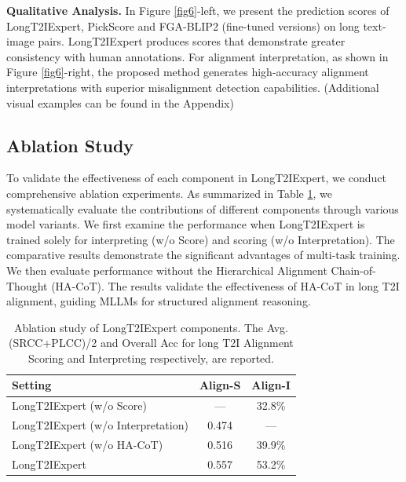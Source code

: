 \documentclass[letterpaper]{article} %
\begin{document}
\textbf{Qualitative Analysis.} In Figure \ref{fig6}-left, we present the prediction scores of LongT2IExpert, PickScore and FGA-BLIP2 (fine-tuned versions) on long text-image pairs. LongT2IExpert produces scores that demonstrate greater consistency with human annotations. For alignment interpretation, as shown in Figure \ref{fig6}-right, the proposed method generates high-accuracy alignment interpretations with superior misalignment detection capabilities. (Additional visual examples can be found in the Appendix)



\subsection{Ablation Study}
To validate the effectiveness of each component in LongT2IExpert, we conduct comprehensive ablation experiments. As summarized in Table \ref{tab:3}, we systematically evaluate the contributions of different components through various model variants. We first examine the performance when LongT2IExpert is trained solely for interpreting (w/o Score) and scoring (w/o Interpretation). The comparative results demonstrate the significant advantages of multi-task training. We then evaluate performance without the Hierarchical Alignment Chain-of-Thought (HA-CoT). The results validate the effectiveness of HA-CoT in long T2I alignment, guiding MLLMs for structured alignment reasoning.

\begin{table}[t]
	\centering
	\small
	\begin{tabular}{l|c|c}
		\toprule
		\textbf{Setting} & \textbf{Align-S} & \textbf{Align-I} \\
		\midrule
		LongT2IExpert (w/o Score) & --- & 32.8\% \\
		LongT2IExpert (w/o Interpretation) & 0.474 & --- \\
		LongT2IExpert (w/o HA-CoT) & 0.516 & 39.9\% \\
		LongT2IExpert & 0.557 & 53.2\% \\
		\bottomrule
	\end{tabular}
	\caption{Ablation study of LongT2IExpert components. The Avg. (SRCC+PLCC)/2 and Overall Acc for long T2I Alignment Scoring and Interpreting respectively, are reported.}
	\label{tab:3}
\end{table}
\end{document}
